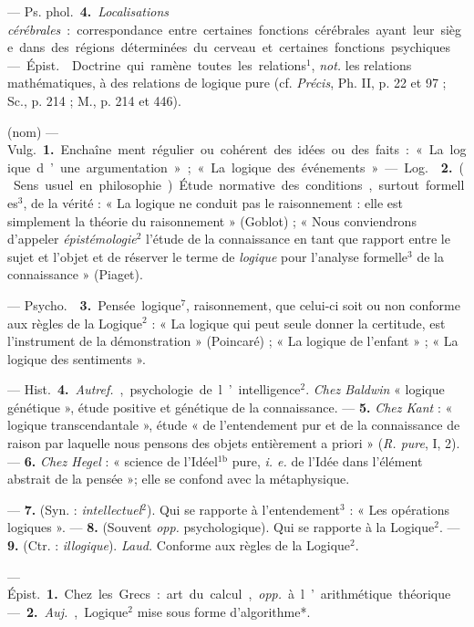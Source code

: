 \begin{itemize}[leftmargin=1cm, label=, itemsep=1pt]
— \si{Ps. phol.} {\bf 4.} {\it Localisations cérébrales} : correspondance
entre certaines fonctions cérébrales ayant leur siège dans des régions
déterminées du cerveau et certaines fonctions psychiques.

 — \si{Épist.}  Doctrine qui ramène toutes les
relations$^1$, {\it not.} les relations mathématiques, à des relations de
logique pure (cf. {\it Précis}, Ph. II, p. 22 et 97 ; Sc., p. 214 ; M., p.
214 et 446).

 (nom) — \si{Vulg.} {\bf 1.} Enchaîne ment régulier ou cohérent
des idées ou des faits : « La logique d’une argumentation » ; « La logique
des événements ».

— \si{Log.}  {\bf 2.} (Sens usuel en philosophie). Étude
normative des conditions, surtout formelles$^3$, de la vérité :
« La logique ne conduit pas le raisonnement : elle est simplement la théorie
du raisonnement » (Goblot) ; « Nous conviendrons d'appeler
{\it épistémologie}$^2$ l'étude de la connaissance en tant que rapport entre
le sujet et l’objet et de réserver le terme de {\it logique} pour l'analyse
formelle$^3$ de la connaissance » (Piaget).

— \si{Psycho.}  {\bf 3.} Pensée logique$^7$, raisonnement, que
celui-ci soit ou non conforme aux règles de la Logique$^2$ : « La logique qui
peut seule donner la certitude, est l’instrument de la
démonstration » (Poincaré) ; « La logique de l’enfant » ; « La logique des
sentiments ».

— \si{Hist.} {\bf 4.} {\it Autref.}, psychologie de l’intelligence$^2$.
{\it Chez Baldwin} « logique génétique », étude positive et génétique de la
connaissance. — {\bf 5.} {\it Chez Kant} : « logique transcendantale », étude
« de l’entendement pur et de la connaissance de raison par laquelle nous
pensons des objets entièrement a priori » ({\it R. pure}, I, 2). — {\bf 6.}
{\it Chez Hegel} : « science de l'Idéel$^\text{1b}$ pure, {\it i. e.} de
l’Idée dans l'élément abstrait de la pensée »; elle se confond avec la
métaphysique.

 — {\bf 7.} (Syn. : {\it intellectuel}$^2$). Qui se
rapporte à l’entendement$^3$ : « Les opérations logiques ». — {\bf 8.}
(Souvent {\it opp.} psychologique). Qui se rapporte à la Logique$^2$. —
{\bf 9.} (Ctr. : {\it illogique}). {\it Laud.} Conforme aux règles de la
Logique$^2$.

 — \si{Épist.} {\bf 1.} Chez les Grecs : art du calcul,
{\it opp.} à l’arithmétique théorique. — {\bf 2.} {\it Auj.}, Logique$^2$
mise sous forme d’algorithme*.


\end{itemize}
